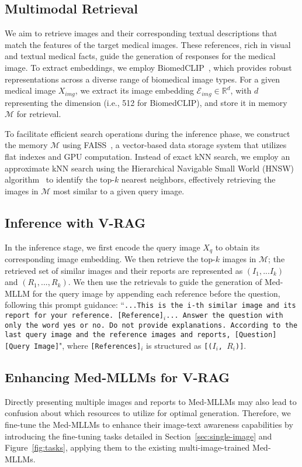 \subsection{Multimodal Retrieval}

We aim to retrieve images and their corresponding textual descriptions that match the features of the target medical images. These references, rich in visual and textual medical facts, guide the generation of responses for the medical image. To extract embeddings, we employ BiomedCLIP~\cite{Zhang2023BiomedCLIPAM}, which provides robust representations across a diverse range of biomedical image types. For a given medical image $X_{img}$, we extract its image embedding $\mathcal{E}_{img} \in \mathbb{R}^{d}$, with $d$ representing the dimension (i.e., 512 for BiomedCLIP), and store it in memory $\mathcal{M}$ for retrieval.

To facilitate efficient search operations during the inference phase, we construct the memory $\mathcal{M}$ using FAISS~\cite{douze2024faiss}, a vector-based data storage system that utilizes flat indexes and GPU computation. Instead of exact kNN search, we employ an approximate kNN search using the Hierarchical Navigable Small World (HNSW) algorithm~\cite{Malkov2016EfficientAR} to identify the top-$k$ nearest neighbors, effectively retrieving the images in $\mathcal{M}$ most similar to a given query image.


\subsection{Inference with V-RAG}

In the inference stage, we first encode the query image $X_{q}$ to obtain its corresponding image embedding. We then retrieve the top-$k$ images in $\mathcal{M}$; the retrieved set of similar images and their reports are represented as $(I_{1}, ... I_{k})$ and $(R_{1}, ..., R_{k})$.
We then use the retrievals to guide the generation of Med-MLLM for the query image by appending each reference before the question, following this prompt guidance:
``\texttt{...This is the i-th similar image and its report for your reference. [Reference]$_i$... Answer the question with only the word yes or no. Do not provide explanations. According to the last query image and the reference images and reports, [Question] [Query Image]}", where \texttt{[References]$_i$} is structured as \texttt{[($I_i$, $R_i$)]}.




\subsection{Enhancing Med-MLLMs for V-RAG}
Directly presenting multiple images and reports to Med-MLLMs may also lead to confusion about which resources to utilize for optimal generation. 
Therefore, we fine-tune the Med-MLLMs to enhance their image-text awareness capabilities by introducing the fine-tuning tasks detailed in Section~\ref{sec:single-image} and Figure~\ref{fig:tasks}, applying them to the existing multi-image-trained Med-MLLMs.

